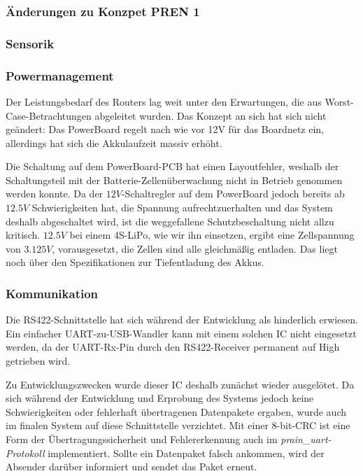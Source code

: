 \documentclass[main.tex]{subfiles} %
\begin{document}

\subsubsection{Änderungen zu Konzpet PREN 1}

\subsubsection*{Sensorik}

\subsubsection*{Powermanagement}

Der Leistungsbedarf des Routers lag weit unter den Erwartungen, die aus
Worst-Case-Betrachtungen abgeleitet wurden. Das Konzept an sich hat sich nicht
geändert: Das PowerBoard regelt nach wie vor 12V für das Boardnetz ein,
allerdings hat sich die Akkulaufzeit massiv erhöht.

Die Schaltung auf dem PowerBoard-PCB hat einen Layoutfehler, weshalb der
Schaltungsteil mit der Batterie-Zellenüberwachung nicht in Betrieb genommen
werden konnte. Da der $12V$-Schaltregler auf dem PowerBoard jedoch bereits ab
$12.5V$ Schwierigkeiten hat, die Spannung aufrechtzuerhalten und das System
deshalb abgeschaltet wird, ist die weggefallene Schutzbeschaltung nicht allzu
kritisch. $12.5V$ bei einem 4S-LiPo, wie wir ihn einsetzen, ergibt eine
Zellspannung von $3.125V$, vorausgesetzt, die Zellen sind alle gleichmäßig
entladen. Das liegt noch über den Spezifikationen zur Tiefentladung des Akkus.

\subsubsection*{Kommunikation}

Die RS422-Schnittstelle hat sich während der Entwicklung als hinderlich
erwiesen. Ein einfacher UART-zu-USB-Wandler kann mit einem solchen IC nicht
eingesetzt werden, da der UART-Rx-Pin durch den RS422-Receiver permanent auf
High getrieben wird.

Zu Entwicklungszwecken wurde dieser IC deshalb zunächst wieder ausgelötet. Da
sich während der Entwicklung und Erprobung des Systems jedoch keine
Schwierigkeiten oder fehlerhaft übertragenen Datenpakete ergaben, wurde auch im
finalen System auf diese Schnittstelle verzichtet. Mit einer 8-bit-CRC ist eine
Form der Übertragungssicherheit und Fehlererkennung auch im
\textit{prain_uart-Protokoll} implementiert. Sollte ein Datenpaket falsch
ankommen, wird der Absender darüber informiert und sendet das Paket erneut.
\end{document}
